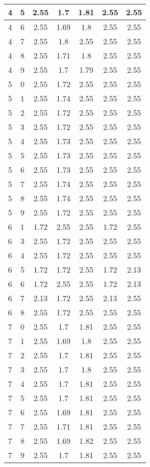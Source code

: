 \begin{longtable}{|c|c||c||c|c||c|c|}
	4 & 5 & 2.55 & 1.7 & 1.81 & 2.55 & 2.55 \\ \hline
	4 & 6 & 2.55 & 1.69 & 1.8 & 2.55 & 2.55 \\ \hline
	4 & 7 & 2.55 & 1.8 & 2.55 & 2.55 & 2.55 \\ \hline
	4 & 8 & 2.55 & 1.71 & 1.8 & 2.55 & 2.55 \\ \hline
	4 & 9 & 2.55 & 1.7 & 1.79 & 2.55 & 2.55 \\ \hline
	5 & 0 & 2.55 & 1.72 & 2.55 & 2.55 & 2.55 \\ \hline
	5 & 1 & 2.55 & 1.74 & 2.55 & 2.55 & 2.55 \\ \hline
	5 & 2 & 2.55 & 1.72 & 2.55 & 2.55 & 2.55 \\ \hline
	5 & 3 & 2.55 & 1.72 & 2.55 & 2.55 & 2.55 \\ \hline
	5 & 4 & 2.55 & 1.73 & 2.55 & 2.55 & 2.55 \\ \hline
	5 & 5 & 2.55 & 1.73 & 2.55 & 2.55 & 2.55 \\ \hline
	5 & 6 & 2.55 & 1.73 & 2.55 & 2.55 & 2.55 \\ \hline
	5 & 7 & 2.55 & 1.74 & 2.55 & 2.55 & 2.55 \\ \hline
	5 & 8 & 2.55 & 1.74 & 2.55 & 2.55 & 2.55 \\ \hline
	5 & 9 & 2.55 & 1.72 & 2.55 & 2.55 & 2.55 \\ \hline
	6 & 1 & 1.72 & 2.55 & 2.55 & 1.72 & 2.55 \\ \hline
	6 & 3 & 2.55 & 1.72 & 2.55 & 2.55 & 2.55 \\ \hline
	6 & 4 & 2.55 & 1.72 & 2.55 & 2.55 & 2.55 \\ \hline
	6 & 5 & 1.72 & 1.72 & 2.55 & 1.72 & 2.13 \\ \hline
	6 & 6 & 1.72 & 2.55 & 2.55 & 1.72 & 2.13 \\ \hline
	6 & 7 & 2.13 & 1.72 & 2.55 & 2.13 & 2.55 \\ \hline
	6 & 8 & 2.55 & 1.72 & 2.55 & 2.55 & 2.55 \\ \hline
	7 & 0 & 2.55 & 1.7 & 1.81 & 2.55 & 2.55 \\ \hline
	7 & 1 & 2.55 & 1.69 & 1.8 & 2.55 & 2.55 \\ \hline
	7 & 2 & 2.55 & 1.7 & 1.81 & 2.55 & 2.55 \\ \hline
	7 & 3 & 2.55 & 1.7 & 1.8 & 2.55 & 2.55 \\ \hline
	7 & 4 & 2.55 & 1.7 & 1.81 & 2.55 & 2.55 \\ \hline
	7 & 5 & 2.55 & 1.7 & 1.81 & 2.55 & 2.55 \\ \hline
	7 & 6 & 2.55 & 1.69 & 1.81 & 2.55 & 2.55 \\ \hline
	7 & 7 & 2.55 & 1.71 & 1.81 & 2.55 & 2.55 \\ \hline
	7 & 8 & 2.55 & 1.69 & 1.82 & 2.55 & 2.55 \\ \hline
	7 & 9 & 2.55 & 1.7 & 1.81 & 2.55 & 2.55 \\ \hline
\end{longtable}
